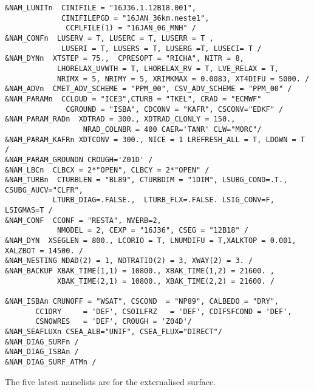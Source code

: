 \begin{verbatim}
&NAM_LUNITn  CINIFILE = "16J36.1.12B18.001",
             CINIFILEPGD = "16JAN_36km.neste1",
              CCPLFILE(1) = "16JAN_06_MNH" /
&NAM_CONFn  LUSERV = T, LUSERC = T, LUSERR = T ,
             LUSERI = T, LUSERS = T, LUSERG =T, LUSECI= T /
&NAM_DYNn  XTSTEP = 75.,  CPRESOPT = "RICHA", NITR = 8,
            LHORELAX_UVWTH = T, LHORELAX_RV = T, LVE_RELAX = T,
            NRIMX = 5, NRIMY = 5, XRIMKMAX = 0.0083, XT4DIFU = 5000. /
&NAM_ADVn  CMET_ADV_SCHEME = "PPM_00", CSV_ADV_SCHEME = "PPM_00" /
&NAM_PARAMn  CCLOUD = "ICE3",CTURB = "TKEL", CRAD = "ECMWF"
              CGROUND = "ISBA", CDCONV = "KAFR", CSCONV="EDKF" /
&NAM_PARAM_RADn  XDTRAD = 300., XDTRAD_CLONLY = 150.,
                  NRAD_COLNBR = 400 CAER='TANR' CLW="MORC"/
&NAM_PARAM_KAFRn XDTCONV = 300., NICE = 1 LREFRESH_ALL = T, LDOWN = T /
&NAM_PARAM_GROUNDN CROUGH='Z01D' /
&NAM_LBCn  CLBCX = 2*"OPEN", CLBCY = 2*"OPEN" /
&NAM_TURBn  CTURBLEN = "BL89", CTURBDIM = "1DIM", LSUBG_COND=.T., CSUBG_AUCV="CLFR",
           LTURB_DIAG=.FALSE.,  LTURB_FLX=.FALSE. LSIG_CONV=F, LSIGMAS=T /
&NAM_CONF  CCONF = "RESTA", NVERB=2,
            NMODEL = 2, CEXP = "16J36", CSEG = "12B18" /
&NAM_DYN  XSEGLEN = 800., LCORIO = T, LNUMDIFU = T,XALKTOP = 0.001, XALZBOT = 14500. /
&NAM_NESTING NDAD(2) = 1, NDTRATIO(2) = 3, XWAY(2) = 3. /
&NAM_BACKUP XBAK_TIME(1,1) = 10800., XBAK_TIME(1,2) = 21600. ,
            XBAK_TIME(2,1) = 10800., XBAK_TIME(2,2) = 21600. /

&NAM_ISBAn CRUNOFF = "WSAT", CSCOND  = "NP89", CALBEDO = "DRY",
       CC1DRY     = 'DEF', CSOILFRZ   = 'DEF', CDIFSFCOND = 'DEF', 
       CSNOWRES   = 'DEF', CROUGH = 'Z04D'/
&NAM_SEAFLUXn CSEA_ALB="UNIF", CSEA_FLUX="DIRECT"/
&NAM_DIAG_SURFn /
&NAM_DIAG_ISBAn /
&NAM_DIAG_SURF_ATMn /
\end{verbatim}
The five latest namelists are for the externalised surface.

